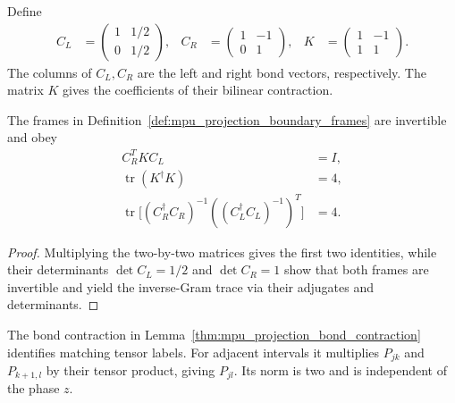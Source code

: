 \begin{definition}
    \label{def:mpu_projection_boundary_frames}
    \leanok
    Define
    \begin{align}
        C_L & =\begin{pmatrix}1&1/2\\0&1/2\end{pmatrix}, &
        C_R & =\begin{pmatrix}1&-1\\0&1\end{pmatrix},    &
        K   & =\begin{pmatrix}1&-1\\1&1\end{pmatrix}.
    \end{align}
    The columns of $C_L,C_R$ are the left and right bond vectors, respectively.
    The matrix $K$ gives the coefficients of their bilinear contraction.
\end{definition}

\begin{lemma}
    \label{thm:mpu_projection_bond_contraction}
    \leanok
    The frames in Definition~\ref{def:mpu_projection_boundary_frames} are
    invertible and obey
    \begin{align}
        C_R^T K C_L                      & =I, \\
        \operatorname{tr}(K^\dagger K)   & =4, \\
        \operatorname{tr}\bigl[(C_R^\dagger C_R)^{-1}
        ((C_L^\dagger C_L)^{-1})^T\bigr] & =4.
    \end{align}
\end{lemma}

\begin{proof}\leanok
    Multiplying the two-by-two matrices gives the first two identities, while
    their determinants $\det C_L=1/2$ and $\det C_R=1$ show that both frames
    are invertible and yield the inverse-Gram trace via their adjugates and
    determinants.
\end{proof}

The bond contraction in Lemma~\ref{thm:mpu_projection_bond_contraction}
identifies matching tensor labels. For adjacent intervals it multiplies
$P_{jk}$ and $P_{k+1,l}$ by their tensor product, giving $P_{jl}$.
Its norm is two and is independent of the phase $z$.

